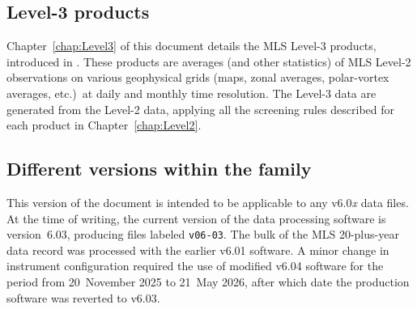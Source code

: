 \subsection{Level-3 products}
Chapter~\ref{chap:Level3} of this document details the MLS \mbox{Level-3} products, introduced in \viv.  These products are averages (and other statistics) of MLS \mbox{Level-2} observations on various geophysical grids (maps, zonal averages, polar-vortex averages, etc.)\ at daily and monthly time resolution. The \mbox{Level-3} data are generated from the \mbox{Level-2} data, applying all the screening rules described for each product in Chapter~\ref{chap:Level2}.

\subsection{Different versions within the \thisv family}
This version of the document is intended to be applicable to any v6.0\emph{x} data files. At the time of writing, the current version of the data processing software is version~6.03, producing files labeled \texttt{v06-03}. The bulk of the MLS 20-plus-year data record was processed with the earlier v6.01 software.  A minor change in instrument configuration required the use of modified v6.04 software for the period from 20~November 2025 to 21~May 2026, after which date the production software was reverted to v6.03.


